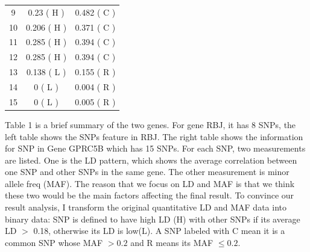\documentclass{article}
\begin{document}
\begin{table}[htbp]
{\begin{minipage}[b]{0.4 \textwidth}
\begin{tabular}{c|cc}
                        9	&	0.23	(	H	)&	0.482	(	C	)\\
                        10	&	0.206	(	H	)&	0.371	(	C	)\\
                        11	&	0.285	(	H	)&	0.394	(	C	)\\
                        12	&	0.285	(	H	)&	0.394	(	C	)\\
                        13	&	0.138	(	L	)&	0.155	(	R	)\\
                        14	&	0	(	L	)&	0.004	(	R	)\\
                        15	&	0	(	L	)&	0.005	(	R	)\\
                        \bottomrule
                    \end{tabular}
                \end{minipage}
            }
        \end{table}

        Table 1 is a brief summary of the two genes. For gene RBJ, it has 8 SNPs, the left table shows the SNPs feature in RBJ. The right table shows the information for SNP in Gene GPRC5B which has 15 SNPs. For each SNP, two measurements are listed. One is the LD pattern, which shows the average correlation between one SNP and other SNPs in the same gene. The other measurement is minor allele freq (MAF). The reason that we focus on LD and MAF is that we think these two would be the main factors affecting the final result. To convince our result analysis, I transform the original quantitative LD and MAF data into binary data: SNP is defined to have high LD (H) with other SNPs if its average LD $>$ 0.18, otherwise its LD is low(L). A SNP labeled with C mean it is a common SNP whose MAF $>0.2$ and R means its MAF $\leq 0.2$.
        
\end{document}
